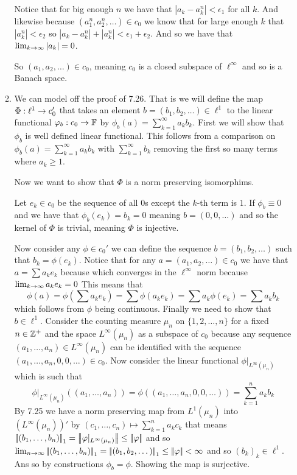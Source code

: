 \documentclass[12pt]{amsart}
\begin{document}
\begin{itemize}
\begin{enumerate}[label=(\alph*)]
    Notice that for big enough $n$ we have that $|a_k-a_k^n|<\epsilon_1$ for all $k$. And likewise because $(a^n_1,a^n_2,\dots)\in c_0$ we know that
    for large enough $k$ that $|a^n_k|<\epsilon_2$ so $|a_k-a^n_k|+|a^n_k|<\epsilon_1+\epsilon_2$. And so we have that $\lim_{k\rightarrow\infty}|a_k|=0$.

    So $(a_1,a_2,\dots)\in c_0$, meaning $c_0$ is a closed 
    subspace of $\ell^\infty$ and so is a Banach space.



    \item 
    We can model off the proof of 7.26. That is we will define the map $\Phi:\ell^1\rightarrow c_0'$ that takes an 
    element $b=(b_1,b_2,\dots)\in \ell^1$ to the linear functional $\varphi_b:c_0\rightarrow \mathbb{F}$ by 
    $\phi_b(a)=\sum_{k=1}^\infty a_k b_k$. First we will show that $\phi_b$ is well defined linear functional. 
    This follows from a comparison on $\phi_b(a)=\sum_{k=1}^\infty a_k b_k$ with $\sum_{k=1}^\infty b_k$ removing the first so many terms where $a_k\geq 1$.

    Now we want to show that $\Phi$ is a norm preserving isomorphims.

    Let $e_k\in c_0$ be the sequence of all $0$s except the $k$-th term is $1$. 
    If $\phi_b\equiv 0$ and we have that $\phi_b(e_k)=b_k=0$ meaning $b=(0,0,\dots)$ and so the kernel of $\Phi$ is trivial, meaning $\Phi$ is injective.

    Now consider any $\phi\in c_0'$ we can define the sequence $b=(b_1,b_2,\dots)$ such that $b_k=\phi(e_k)$. 
    Notice that for any $a=(a_1,a_2,\dots)\in c_0$ we have
    that $a=\sum a_ke_k$ because which converges in the $\ell^\infty$ norm because $\lim_{k\rightarrow\infty}{a_ke_k}=0$ %
    This means that 
    \[\phi(a)=\phi(\sum a_ke_k)=\sum \phi(a_ke_k)=\sum a_k\phi(e_k)=\sum a_kb_k\] 
    which follows from $\phi$ being continuous.
    Finally we need to show that $b\in \ell^1$. Consider the counting measure $\mu_n$ on $\{1,2,\dots,n\}$ for a fixed $n\in\mathbb{Z}^+$
    and the space $L^\infty(\mu_n)$ as a subspace of $c_0$ because any sequence $(a_1,\dots,a_n)\in L^\infty(\mu_n)$
    can be identified with the sequence $(a_1,\dots,a_n,0,0,\dots)\in c_0$. Now consider the linear functional $\phi|_{L^\infty(\mu_n)}$ which is such that
    \[\phi|_{L^\infty(\mu_n)}((a_1,\dots,a_n))=\phi((a_1,\dots,a_n,0,0,\dots))=\sum_{k=1}^n a_kb_k\]
    By 7.25 we have a norm preserving map from $L^1(\mu_n)$ into $(L^\infty(\mu_n))'$ by $(c_1,\dots,c_n)\mapsto\sum_{k=1}^n a_kc_k$ that means 
    $\norm{(b_1,\dots,b_n)}_1=\norm{\phi|_{L^\infty(\mu_n)}}\leq \norm{\phi}$ and so 
    $\lim_{n\ra \infty}\norm{(b_1,\dots,b_n)}_1=\norm{(b_1,b_2,\dots)}_1\leq \norm{\phi}<\infty$ and so 
    $(b_k)_k\in \ell^1$. Ans so by constructions $\phi_b=\phi$. Showing the map is surjective.


\end{enumerate}
\end{itemize}
\end{document}
